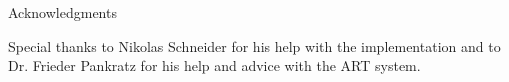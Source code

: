 \thispagestyle{empty}

\vspace*{20mm}

\begin{center}
{ Acknowledgments}
\end{center}

\vspace{10mm}

Special thanks to Nikolas Schneider for his help with the implementation and to Dr. Frieder Pankratz for his help and advice with the ART system.

\cleardoublepage{}
